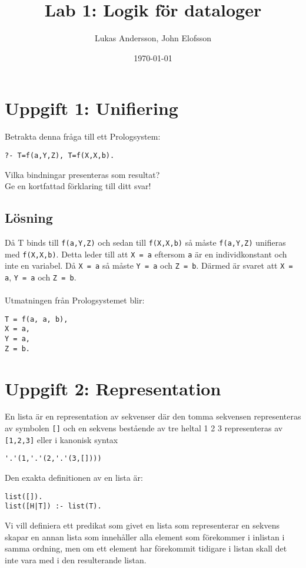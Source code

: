 \documentclass[12pt]{article}
\title{Lab 1: Logik för dataloger}
\author{Lukas Andersson, John Elofsson}
\date{\today}
\begin{document}
\maketitle

\section*{Uppgift 1: Unifiering}
Betrakta denna fråga till ett Prologsystem:

\begin{verbatim}
?- T=f(a,Y,Z), T=f(X,X,b).
\end{verbatim}
Vilka bindningar presenteras som resultat?
\\
Ge en kortfattad förklaring till ditt svar!

\subsection*{Lösning}
Då T binds till \texttt{f(a,Y,Z)} och sedan till \texttt{f(X,X,b)} så måste \texttt{f(a,Y,Z)} unifieras med \texttt{f(X,X,b)}. Detta leder till att \texttt{X = a} eftersom \texttt{a} är en individkonstant och inte en variabel. Då \texttt{X = a} så måste \texttt{Y = a} och \texttt{Z = b}. Därmed är svaret att \texttt{X = a}, \texttt{Y = a} och \texttt{Z = b}.
\\
\\
Utmatningen från Prologsystemet blir:
\begin{verbatim}
T = f(a, a, b),
X = a,
Y = a,
Z = b.
\end{verbatim}

\section*{Uppgift 2: Representation}

En lista är en representation av sekvenser där 
den tomma sekvensen representeras av symbolen \texttt{[]} 
och en sekvens bestående av tre heltal 1 2 3 
representeras av \texttt{[1,2,3]} eller i kanonisk syntax 
\begin{verbatim}
'.'(1,'.'(2,'.'(3,[])))
\end{verbatim}

Den exakta definitionen av en lista är:

\begin{verbatim}
list([]).
list([H|T]) :- list(T).
\end{verbatim}

Vi vill definiera ett predikat som givet en lista som 
representerar en sekvens skapar en annan lista som innehåller
alla element som förekommer i inlistan i samma ordning, men 
om ett element har förekommit tidigare i listan skall det 
inte vara med i den resulterande listan.
\end{document}
